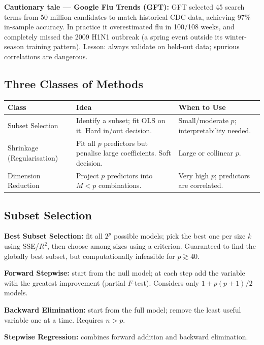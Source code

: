 \documentclass[12pt, a4paper]{article}
\begin{document}
\textbf{Cautionary tale — Google Flu Trends (GFT):} GFT selected 45 search terms from 50 million candidates to match historical CDC data, achieving 97\% in-sample accuracy. In practice it overestimated flu in 100/108 weeks, and completely missed the 2009 H1N1 outbreak (a spring event outside its winter-season training pattern). Lesson: always validate on held-out data; spurious correlations are dangerous.

\subsection{Three Classes of Methods}

\begin{center}
\begin{tabular}{lp{5cm}p{5cm}}
\toprule
\textbf{Class} & \textbf{Idea} & \textbf{When to Use} \\
\midrule
Subset Selection & Identify a subset; fit OLS on it. Hard in/out decision. & Small/moderate $p$; interpretability needed. \\[4pt]
Shrinkage (Regularisation) & Fit all $p$ predictors but penalise large coefficients. Soft decision. & Large or collinear $p$. \\[4pt]
Dimension Reduction & Project $p$ predictors into $M < p$ combinations. & Very high $p$; predictors are correlated. \\
\bottomrule
\end{tabular}
\end{center}

\subsection{Subset Selection}

\textbf{Best Subset Selection:} fit all $2^p$ possible models; pick the best one per size $k$ using SSE/$R^2$, then choose among sizes using a criterion. Guaranteed to find the globally best subset, but computationally infeasible for $p \gtrsim 40$.

\textbf{Forward Stepwise:} start from the null model; at each step add the variable with the greatest improvement (partial $F$-test). Considers only $1 + p(p+1)/2$ models.

\textbf{Backward Elimination:} start from the full model; remove the least useful variable one at a time. Requires $n > p$.

\textbf{Stepwise Regression:} combines forward addition and backward elimination.
\end{document}
